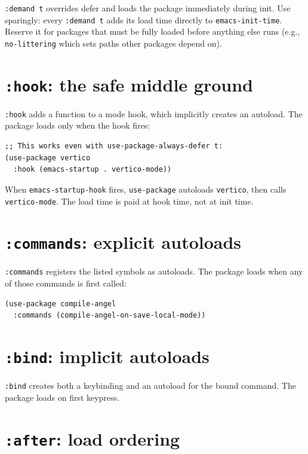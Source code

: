 \texttt{:demand t} overrides defer and loads the package immediately during init. Use sparingly: every \texttt{:demand t} adds its load time directly to \texttt{emacs-init-time}. Reserve it for packages that must be fully loaded before anything else runs (e.g., \texttt{no-littering} which sets paths other packages depend on).

\section{\texttt{:hook}: the safe middle ground}\label{hook-the-safe-middle-ground}

\texttt{:hook} adds a function to a mode hook, which implicitly creates an autoload. The package loads only when the hook fires:

\begin{verbatim}
;; This works even with use-package-always-defer t:
(use-package vertico
  :hook (emacs-startup . vertico-mode))
\end{verbatim}

When \texttt{emacs-startup-hook} fires, \texttt{use-package} autoloads \texttt{vertico}, then calls \texttt{vertico-mode}. The load time is paid at hook time, not at init time.

\section{\texttt{:commands}: explicit autoloads}\label{commands-explicit-autoloads}

\texttt{:commands} registers the listed symbols as autoloads. The package loads when any of those commands is first called:

\begin{verbatim}
(use-package compile-angel
  :commands (compile-angel-on-save-local-mode))
\end{verbatim}

\section{\texttt{:bind}: implicit autoloads}\label{bind-implicit-autoloads}

\texttt{:bind} creates both a keybinding and an autoload for the bound command. The package loads on first keypress.

\section{\texttt{:after}: load ordering}\label{after-load-ordering}

